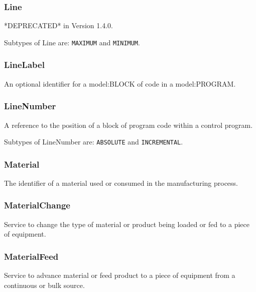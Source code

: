\subsubsection{Line}
  \label{sec:Line}


*DEPRECATED* in Version 1.4.0.


Subtypes of Line are: \texttt{MAXIMUM} and \texttt{MINIMUM}. 
\FloatBarrier

\subsubsection{LineLabel}
  \label{sec:LineLabel}


An optional identifier for a {model:BLOCK} of code in a {model:PROGRAM}.

\FloatBarrier

\subsubsection{LineNumber}
  \label{sec:LineNumber}


A reference to the position of a block of program code within a control program.


Subtypes of LineNumber are: \texttt{ABSOLUTE} and \texttt{INCREMENTAL}. 
\FloatBarrier

\subsubsection{Material}
  \label{sec:Material}


The identifier of a material used or consumed in the manufacturing process.

\FloatBarrier

\subsubsection{MaterialChange}
  \label{sec:MaterialChange}


Service to change the type of material or product being loaded or fed to a piece of equipment.

\FloatBarrier

\subsubsection{MaterialFeed}
  \label{sec:MaterialFeed}


Service to advance material or feed product to a piece of equipment from a continuous or bulk source.

